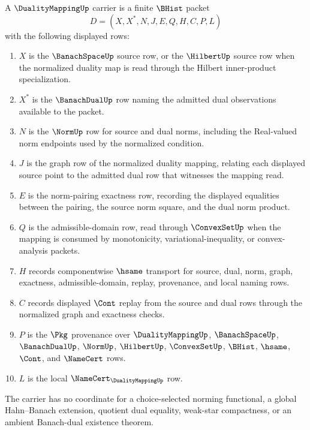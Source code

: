 \begin{definition}
\label{def:duality-mapping-carrier}
A $\DualityMappingUp$ carrier is a finite $\BHist$ packet
$$
D=(X,X^\ast,N,J,E,Q,H,C,P,L)
$$
with the following displayed rows:
\begin{enumerate}
\item $X$ is the $\BanachSpaceUp$ source row, or the $\HilbertUp$ source row when the normalized duality map is read through the Hilbert inner-product specialization.
\item $X^\ast$ is the $\BanachDualUp$ row naming the admitted dual observations available to the packet.
\item $N$ is the $\NormUp$ row for source and dual norms, including the Real-valued norm endpoints used by the normalized condition.
\item $J$ is the graph row of the normalized duality mapping, relating each displayed source point to the admitted dual row that witnesses the mapping read.
\item $E$ is the norm-pairing exactness row, recording the displayed equalities between the pairing, the source norm square, and the dual norm product.
\item $Q$ is the admissible-domain row, read through $\ConvexSetUp$ when the mapping is consumed by monotonicity, variational-inequality, or convex-analysis packets.
\item $H$ records componentwise $\hsame$ transport for source, dual, norm, graph, exactness, admissible-domain, replay, provenance, and local naming rows.
\item $C$ records displayed $\Cont$ replay from the source and dual rows through the normalized graph and exactness checks.
\item $P$ is the $\Pkg$ provenance over $\DualityMappingUp$, $\BanachSpaceUp$, $\BanachDualUp$, $\NormUp$, $\HilbertUp$, $\ConvexSetUp$, $\BHist$, $\hsame$, $\Cont$, and $\NameCert$ rows.
\item $L$ is the local $\NameCert_{\DualityMappingUp}$ row.
\end{enumerate}
The carrier has no coordinate for a choice-selected norming functional, a global Hahn--Banach extension, quotient dual equality, weak-star compactness, or an ambient Banach-dual existence theorem.
\end{definition}

